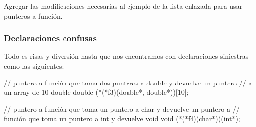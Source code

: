\documentclass[]{scrartcl}
\begin{document}
\begin{exbox}
  Agregar las modificaciones necesarias al ejemplo de la lista enlazada para usar punteros a función.
\end{exbox}

\subsubsection*{Declaraciones confusas}

Todo es risas y diversión hasta que nos encontramos con declaraciones siniestras como las siguientes:

\begin{cbox}[]{}
  // puntero a función que toma dos punteros a double y devuelve un puntero 
  // a un array de 10 double
  double (*(*f3)(double*, double*))[10];

  // puntero a función que toma un puntero a char y devuelve un puntero a 
  // función que toma un puntero a int y devuelve void
  void (*(*f4)(char*))(int*);
\end{cbox}

\begin{center}
  \noindent {}
  \label{fig:function-pointer-meme}
\end{center}
\end{document}
